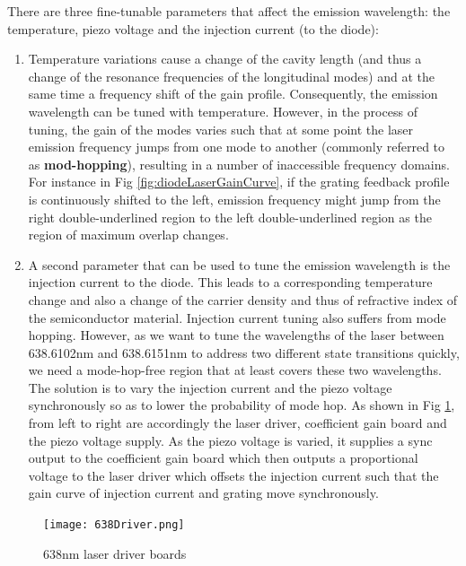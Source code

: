 \documentclass[12pt]{report}
\begin{document}
There are three fine-tunable parameters that affect the emission wavelength: the temperature, piezo voltage and the injection current (to the diode): 
\begin{enumerate}
    \item Temperature variations cause a change of the cavity length (and thus a change of the resonance frequencies of the longitudinal modes) and at the same time a frequency shift of the gain profile. Consequently, the emission wavelength can be tuned with temperature. However, in the process of tuning, the gain of the modes varies such that at some point the laser emission frequency jumps from one mode to another (commonly referred to as \textbf{mod-hopping}), resulting in a number of inaccessible frequency domains. For instance in Fig \ref{fig:diodeLaserGainCurve}, if the grating feedback profile is continuously shifted to the left, emission frequency might jump from the right double-underlined region to the left double-underlined region as the region of maximum overlap changes.

    \item A second parameter that can be used to tune the emission wavelength is the injection current to the diode. This leads to a corresponding temperature change and also a change of the carrier density and thus of refractive index of the semiconductor material. Injection current tuning also suffers from mode hopping. However, as we want to tune the wavelengths of the laser between 638.6102nm and 638.6151nm to address two different state transitions quickly, we need a mode-hop-free region that at least covers these two wavelengths. The solution is to vary the injection current and the piezo voltage synchronously so as to lower the probability of mode hop. As shown in Fig \ref{fig:638Driver}, from left to right are accordingly the laser driver, coefficient gain board and the piezo voltage supply. As the piezo voltage is varied, it supplies a sync output to the coefficient gain board which then outputs a proportional voltage to the laser driver which offsets the injection current such that the gain curve of injection current and grating move synchronously. 
\end{enumerate}

\begin{figure}[H]
    \centering
    \texttt{[image: 638Driver.png]}
    \caption{638nm laser driver boards}
    \label{fig:638Driver}
\end{figure}
 
\end{document}
